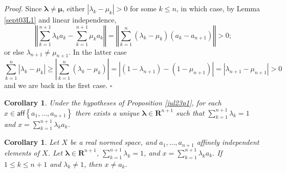 \documentclass[11pt]{article}%
\newtheorem{corollary}[theorem]{Corollary}
\newenvironment{proof}[1][Proof]{\noindent\textit{#1.} }{}
\begin{document}
\begin{proof}
Since $\mathbf{\lambda}\neq\mathbf{\mu}$, either $\left\vert \lambda_{k}%
-\mu_{k}\right\vert >0$ for some $k\leq n$, in which case, by Lemma
\ref{sept03L1} and linear independence,%
\[
\left\Vert
{\textstyle\sum_{k=1}^{n+1}}
\lambda_{k}a_{k}-%
{\textstyle\sum_{k=1}^{n+1}}
\mu_{k}a_{k}\right\Vert =\left\Vert
{\textstyle\sum_{k=1}^{n}}
\left(  \lambda_{k}-\mu_{k}\right)  (a_{k}-a_{n+1})\right\Vert >0\text{;}%
\]
or else $\lambda_{n+1}\neq\mu_{n+1}$. In the latter case%
\[%
{\textstyle\sum_{k=1}^{n}}
\left\vert \lambda_{k}-\mu_{k}\right\vert \geq\left\vert
{\textstyle\sum_{k=1}^{n}}
\left(  \lambda_{k}-\mu_{k}\right)  \right\vert =\left\vert (1-\lambda
_{n+1})-(1-\mu_{n+1})\right\vert =\left\vert \lambda_{n+1}-\mu_{n+1}%
\right\vert >0
\]
and we are back in the first case.%
\hfill
$\square$
\end{proof}

\begin{corollary}
\label{jul24c1A}Under the hypotheses of \emph{Proposition \ref{jul23p1}}, for
each $x\in\mathsf{aff}\left\{  a_{1},\ldots,a_{n+1}\right\}  $ there exists a
\emph{unique} $\mathbf{\lambda}\in\mathbf{R}^{n+1}$ such that $%
{\textstyle\sum_{k=1}^{n+1}}
\lambda_{k}=1$ and $x=%
{\textstyle\sum_{k=1}^{n+1}}
\lambda_{k}a_{k}$.
\end{corollary}

\begin{corollary}
\label{jul29c1}Let $X$ be a real normed space, and $a_{1},\ldots,a_{n+1}$
affinely independent elements of $X$. Let $\mathbf{\lambda}\in\mathbf{R}%
^{n+1}$, $%
{\textstyle\sum_{k=1}^{n+1}}
\lambda_{k}=1$, and $x=\sum_{k=1}^{n+1}\lambda_{k}a_{k}$. If $1\leq k\leq n+1$
and $\lambda_{k}\neq1$, then $x\neq a_{k}$.
\end{corollary}
\end{document}
